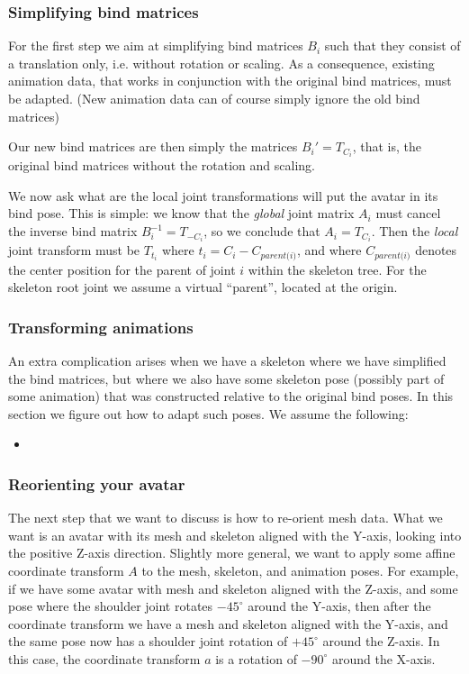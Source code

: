 \subsubsection{Simplifying bind matrices}
For the first step we aim at simplifying bind matrices $B_i$ such that they consist of a translation only,
i.e. without rotation or scaling.
As a consequence, existing animation data, that works in conjunction
with the original bind matrices, must be adapted.
(New animation data can of course simply ignore the old bind matrices)


Our new bind matrices are then simply the matrices $B_i' = T_{C_i}$, that is, the original bind matrices
without the rotation and scaling.

We now ask what are the local joint transformations will put
the avatar in its bind pose.
This is simple: we know that the \emph{global} joint matrix $A_i$
must cancel the inverse bind matrix $B_i^{-1} = T_{-C_i}$, so we conclude that $A_i = T_{C_i}$.
Then the \emph{local} joint transform must be $T_{t_i}$ where $t_i = C_i - C_{\textit{parent(i)}}$,
and where $C_{\textit{parent(i)}}$ denotes the center position for the parent of joint $i$ within
the skeleton tree. For the skeleton root joint we assume a virtual ``parent'', located at the origin.




\subsubsection{Transforming animations}

An extra complication arises when we have a skeleton where we have simplified the bind matrices, but where we
also have some skeleton pose (possibly part of some animation) that was constructed relative to the original
bind poses. In this section we figure out how to adapt such poses.
We assume the following:
\begin{itemize}
\item
\end{itemize}



\subsubsection{Reorienting your avatar}
The next step that we want to discuss is how to re-orient mesh data. What we want is an avatar
with its mesh and skeleton aligned with the Y-axis, looking into the positive Z-axis direction.
Slightly more general, we want to apply some affine coordinate transform $A$ to the mesh, skeleton,
and animation poses. For example, if we have some avatar with mesh and skeleton aligned with the Z-axis,
and some pose where the shoulder joint rotates $-45^\circ$ around the Y-axis,
then after the coordinate transform we have a mesh and skeleton aligned with the Y-axis, and the same
pose now has a shoulder joint rotation of $+45^\circ$ around the Z-axis.
In this case, the coordinate transform $a$ is a rotation of $-90^\circ$ around the X-axis.

